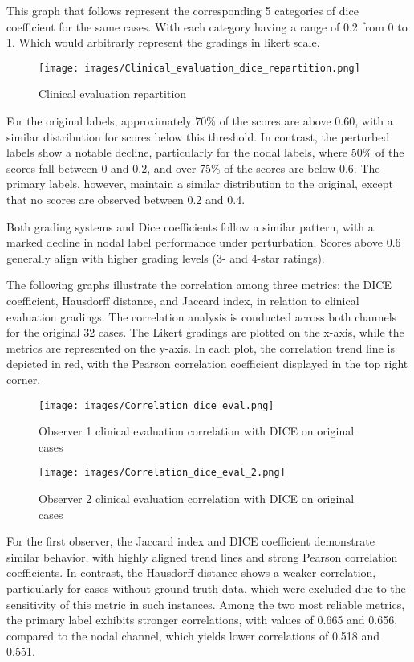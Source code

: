This graph that follows represent the corresponding 5 categories of dice coefficient for the same cases. With each category having a range of 0.2 from 0 to 1.
Which would arbitrarly represent the gradings in likert scale.
\begin{figure}[ht]
    \centering
    \texttt{[image: images/Clinical\_evaluation\_dice\_repartition.png]}
    \caption{Clinical evaluation repartition}
    \label{fig:three_subfigures}
\end{figure}

For the original labels, approximately 70\% of the scores are above 0.60, with a similar distribution for scores below this threshold. In contrast, the perturbed labels show a notable decline, particularly for the nodal labels, where 50\% of the scores fall between 0 and 0.2, and over 75\% of the scores are below 0.6. The primary labels, however, maintain a similar distribution to the original, except that no scores are observed between 0.2 and 0.4.

Both grading systems and Dice coefficients follow a similar pattern, with a marked decline in nodal label performance under perturbation. Scores above 0.6 generally align with higher grading levels (3- and 4-star ratings).

\newpage
The following graphs illustrate the correlation among three metrics: the DICE coefficient, Hausdorff distance, and Jaccard index, 
in relation to clinical evaluation gradings. The correlation analysis is conducted across both channels for the original 32 cases. 
The Likert gradings are plotted on the x-axis, while the metrics are represented on the y-axis. In each plot, the correlation trend 
line is depicted in red, with the Pearson correlation coefficient displayed in the top right corner.

\begin{figure}[ht]
    \centering
    \texttt{[image: images/Correlation\_dice\_eval.png]}
    \caption{Observer 1 clinical evaluation correlation with DICE on original cases}
    \label{fig:three_subfigures}
\end{figure}

\begin{figure}[ht]
    \centering
    \texttt{[image: images/Correlation\_dice\_eval\_2.png]}
    \caption{Observer 2 clinical evaluation correlation with DICE on original cases}
    \label{fig:three_subfigures}
\end{figure}
\newpage
For the first observer, the Jaccard index and DICE coefficient demonstrate similar behavior, with highly aligned trend lines and strong Pearson correlation coefficients. In contrast, the Hausdorff distance shows a weaker correlation, particularly for cases without ground truth data, which were excluded due to the sensitivity of this metric in such instances. Among the two most reliable metrics, the primary label exhibits stronger correlations, with values of 0.665 and 0.656, compared to the nodal channel, which yields lower correlations of 0.518 and 0.551.


